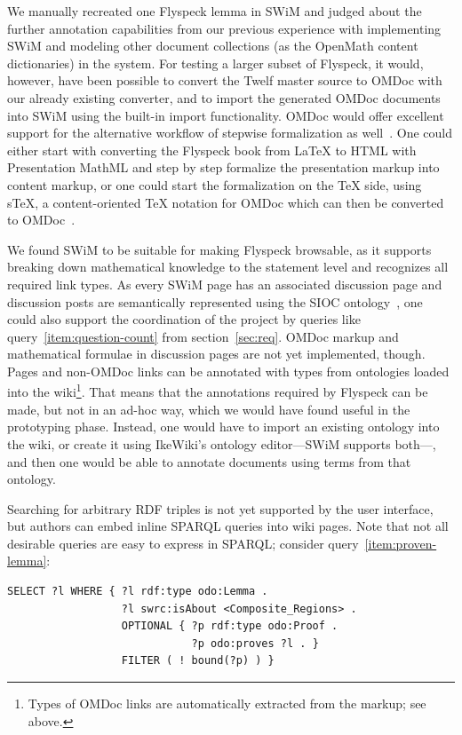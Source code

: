 \documentclass{llncs}
\begin{document}
We manually recreated one Flyspeck lemma in SWiM and judged about the further annotation
capabilities from our previous experience with implementing SWiM and modeling other
document collections (as the OpenMath content dictionaries) in the system. For testing a larger subset of Flyspeck, it would, however, have been possible to
convert the Twelf master source to OMDoc with our already existing converter, and to
import the generated OMDoc documents into SWiM using the built-in import functionality.
OMDoc would offer excellent support for the alternative workflow of stepwise formalization
as well~\cite[chap.\ 4]{Kohlhase:omdoc1.2}.  One could either start with converting the
Flyspeck book from {\LaTeX} to HTML with Presentation MathML and step by step formalize
the presentation markup into content markup, or one could start the formalization on the
{\TeX} side, using s\TeX{}, a content-oriented {\TeX} notation for OMDoc which can then be
converted to OMDoc~\cite{Kohlhase:albwo06}.

We found SWiM to be suitable for making Flyspeck browsable, as it supports breaking down
mathematical knowledge to the statement level and recognizes all required link types.  As
every SWiM page has an associated discussion page and discussion posts are semantically
represented using the SIOC ontology~\cite{SIOC:web}, one could also support the
coordination of the project by queries like query~\ref{item:question-count} from
section~\ref{sec:req}.  OMDoc markup and mathematical formulae in discussion pages are not
yet implemented, though.  Pages and non-OMDoc links can be annotated with types from
ontologies loaded into the wiki\footnote{Types of OMDoc links are automatically extracted
  from the markup; see above.}.  That means that the annotations required by Flyspeck can
be made, but not in an ad-hoc way, which we would have found useful in the prototyping
phase.  Instead, one would have to import an existing ontology into the wiki, or create it
using IkeWiki's ontology editor---SWiM supports both---, and then one would be able to
annotate documents using terms from that ontology.

Searching for arbitrary RDF triples is not yet supported by the user interface,
but authors can embed inline SPARQL queries into wiki pages.  Note that not all desirable
queries are easy to express in SPARQL; consider query~\ref{item:proven-lemma}:

\begin{lstlisting}
SELECT ?l WHERE { ?l rdf:type odo:Lemma .
                  ?l swrc:isAbout <Composite_Regions> .
                  OPTIONAL { ?p rdf:type odo:Proof .
                             ?p odo:proves ?l . }
                  FILTER ( ! bound(?p) ) }
\end{lstlisting}
\end{document}
